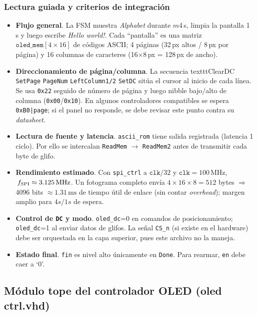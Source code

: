 \documentclass[a4paper,12pt]{article}
\begin{document}
\subsubsection*{Lectura guiada y criterios de integración}
\begin{itemize}
  \item \textbf{Flujo general}. La FSM muestra \emph{Alphabet} durante \(m\)4\,s, limpia la pantalla 1\,s y luego escribe \emph{Hello world!}. Cada “pantalla” es una matriz \(\texttt{oled\_mem}[4 \times 16]\) de códigos ASCII; 4 páginas (32\,px altos / 8\,px por página) y 16 columnas de caracteres (16\(\times\)8\,px = 128\,px de ancho).
  \item \textbf{Direccionamiento de página/columna}. La secuencia texttt{ClearDC} \texttt{SetPage} \texttt{PageNum} \texttt{LeftColumn1/2} \texttt{SetDC} sitúa el cursor al inicio de cada línea. Se usa \texttt{0x22} seguido de número de página y luego nibble bajo/alto de columna (\texttt{0x00}/\texttt{0x10}). En algunos controladores compatibles se espera \texttt{0xB0|page}; si el panel no responde, se debe revisar este punto contra su \emph{datasheet}.
  \item \textbf{Lectura de fuente y latencia}. \texttt{ascii\_rom} tiene salida registrada (latencia 1 ciclo). Por ello se intercalan \texttt{ReadMem} \(\rightarrow\) \texttt{ReadMem2} antes de transmitir cada byte de glifo.
  \item \textbf{Rendimiento estimado}. Con \texttt{spi\_ctrl} a \(\texttt{clk}/32\) y \(\texttt{clk}=100\,\text{MHz}\), \(\,f_{\rm SPI}\approx 3.125\,\text{MHz}\). Un fotograma completo envía \(4\times16\times 8=512\) bytes \(\Rightarrow\) 4096 bits \(\approx 1.31\,\text{ms}\) de tiempo útil de enlace (sin contar \emph{overhead}); margen amplio para \({4}{s}/{1}{s}\) de espera.
  \item \textbf{Control de \texttt{DC} y modo}. \texttt{oled\_dc}=0 en comandos de posicionamiento; \texttt{oled\_dc}=1 al enviar datos de glifos. La señal \texttt{CS\_n} (si existe en el hardware) debe ser orquestada en la capa superior, pues este archivo no la maneja.
  \item \textbf{Estado final}. \texttt{fin} es nivel alto únicamente en \texttt{Done}. Para rearmar, \texttt{en} debe caer a ‘0’.
\end{itemize}

\subsection{Módulo tope del controlador OLED (oled ctrl.vhd)}
\label{sec:oledctrl}
\end{document}
